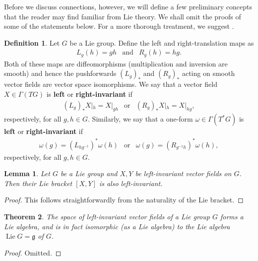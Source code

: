 \documentclass{book}
\newcommand{\fr}{\mathfrak}
\DeclareMathOperator{\Lie}{Lie}
\theoremstyle{plain}
\newtheorem{thm}{Theorem}
\newtheorem{lem}[thm]{Lemma}
\theoremstyle{definition}
\newtheorem{defn}{Definition}
\theoremstyle{remark}
\begin{document}
Before we discuss connections, however, we will define a few preliminary concepts that the reader may find familiar from Lie theory.
We shall omit the proofs of some of the statements below. For a more thorough treatment, we suggest .

\begin{defn}
    Let $G$ be a Lie group. Define the left and right-translation maps as
    \[
        \begin{array}{ccc}
            L_g(h)=gh & \text{and} & R_g(h)=hg.
        \end{array}
    \]
    Both of these maps are diffeomorphisms (multiplication and inversion are smooth) and hence the pushforwards $(L_g)_*$ and $(R_g)_*$
    acting on smooth vector fields are vector space isomorphisms. We say that a vector field $X\in\Gamma(TG)$ is \textbf{left} or \textbf{right-invariant} if
    \[
        \begin{array}{ccc}
            (L_g)_*X|_h=X|_{gh} & \text{or} & (R_g)_*X|_h=X|_{hg},
        \end{array}
    \]
    respectively, for all $g,h\in G$.
    Similarly, we say that a one-form $\omega\in\Gamma(T^*G)$ is \textbf{left} or \textbf{right-invariant} if
    \[
        \begin{array}{ccc}
            \omega(g)=\left( L_{hg^{-1}} \right)^*\omega(h) & \text{or} & \omega(g)=\left( R_{g^{-1}h} \right)^*\omega(h),
        \end{array}
    \]
    respectively, for all $g,h\in G$.
\end{defn}

\begin{lem}
    Let $G$ be a Lie group and $X,Y$ be left-invariant vector fields on $G$. Then their Lie bracket $[X,Y]$ is also left-invariant.
\end{lem}
\begin{proof}
    This follows straightforwardly from the naturality of the Lie bracket.
\end{proof}

\begin{thm}
    The space of left-invariant vector fields of a Lie group $G$ forms a Lie algebra, and is in fact isomorphic (as a Lie algebra) to the Lie algebra
    $\Lie G=\fr g$ of $G$.
\end{thm}
\begin{proof}
    Omitted.
\end{proof}
\end{document}
